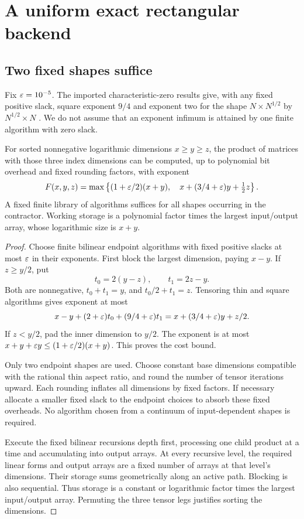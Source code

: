 \section{A uniform exact rectangular backend}
\label{sec:matrix}

\subsection{Two fixed shapes suffice}

Fix $\varepsilon=10^{-5}$. The imported characteristic-zero results give, with
any fixed positive slack, square exponent $9/4$ and exponent two for
the shape $N\times N^{1/2}$ by $N^{1/2}\times N$
\cite{uznanski}. We do not assume that an exponent infimum is attained
by one finite algorithm with zero slack.

\begin{lemma}\label{lem:rectangle}
For sorted nonnegative logarithmic dimensions $x\ge y\ge z$, the product
of matrices with those three index dimensions can be computed, up to
polynomial bit overhead and fixed rounding factors, with exponent
\begin{equation}\label{eq:rectangle}
 F(x,y,z)=\max\left\{
    (1+\varepsilon/2)(x+y),\quad
    x+(3/4+\varepsilon)y+\tfrac12z\right\}.
\end{equation}
A fixed finite library of algorithms suffices for all shapes occurring in
the contractor. Working storage is a polynomial factor times the largest
input/output array, whose logarithmic size is $x+y$.
\end{lemma}

\begin{proof}
Choose finite bilinear endpoint algorithms with fixed positive slacks at
most $\varepsilon$ in their exponents. First block the largest dimension, paying
$x-y$. If $z\ge y/2$, put
\[
 t_0=2(y-z),\qquad t_1=2z-y.
\]
Both are nonnegative, $t_0+t_1=y$, and $t_0/2+t_1=z$.
Tensoring thin and square algorithms gives exponent at most
\[
 x-y+(2+\varepsilon)t_0+(9/4+\varepsilon)t_1
 =x+(3/4+\varepsilon)y+z/2.
\]
If $z<y/2$, pad the inner dimension to $y/2$. The exponent is at most
$x+y+\varepsilon y\le(1+\varepsilon/2)(x+y)$. This proves the cost bound.

Only two endpoint shapes are used. Choose constant base dimensions
compatible with the rational thin aspect ratio, and round the number of
tensor iterations upward. Each rounding inflates all dimensions by
fixed factors. If necessary allocate a smaller fixed slack to the
endpoint choices to absorb these fixed overheads. No algorithm chosen
from a continuum of input-dependent shapes is required.

Execute the fixed bilinear recursions depth first, processing one child
product at a time and accumulating into output arrays. At every recursive
level, the required linear forms and output arrays are a fixed number
of arrays at that level's dimensions. Their storage sums geometrically
along an active path. Blocking is also sequential. Thus storage is a
constant or logarithmic factor times the largest input/output array.
Permuting the three tensor legs justifies sorting the dimensions.
\end{proof}

